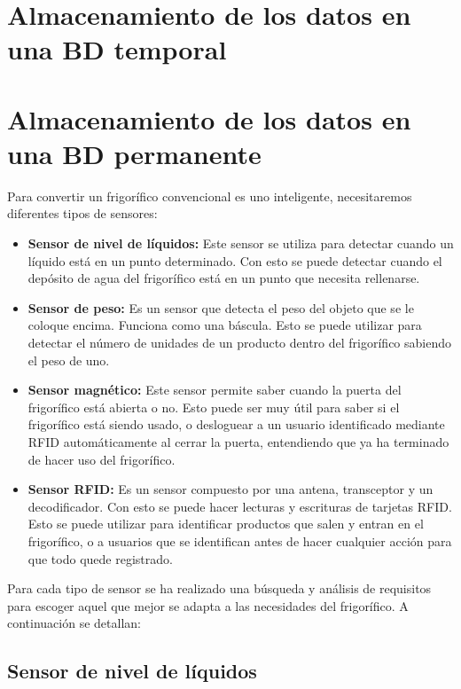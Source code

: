 \section{Almacenamiento de los datos en una BD temporal}

\section{Almacenamiento de los datos en una BD permanente}


Para convertir un frigorífico convencional es uno inteligente, necesitaremos diferentes tipos de sensores:

\begin{itemize}
    \item \textbf{Sensor de nivel de líquidos:} Este sensor se utiliza para detectar cuando un líquido está en un punto determinado. Con esto se puede detectar cuando el depósito de agua del frigorífico está en un punto que necesita rellenarse.
    \item \textbf{Sensor de peso:} Es un sensor que detecta el peso del objeto que se le coloque encima. Funciona como una báscula. Esto se puede utilizar para detectar el número de unidades de un producto dentro del frigorífico sabiendo el peso de uno.
    \item \textbf{Sensor magnético:} Este sensor permite saber cuando la puerta del frigorífico está abierta o no. Esto puede ser muy útil para saber si el frigorífico está siendo usado, o desloguear a un usuario identificado mediante RFID automáticamente al cerrar la puerta, entendiendo que ya ha terminado de hacer uso del frigorífico.
    \item  \textbf{Sensor RFID:} Es un sensor compuesto por una antena, transceptor y un decodificador. Con esto se puede hacer lecturas y escrituras de tarjetas RFID. Esto se puede utilizar para identificar productos que salen y entran en el frigorífico, o a usuarios que se identifican antes de hacer cualquier acción para que todo quede registrado. 
\end{itemize}

Para cada tipo de sensor se ha realizado una búsqueda y análisis de requisitos para escoger  aquel que mejor se adapta a las necesidades del frigorífico. A continuación se detallan:

\clearpage
\subsection{Sensor de nivel de líquidos}

